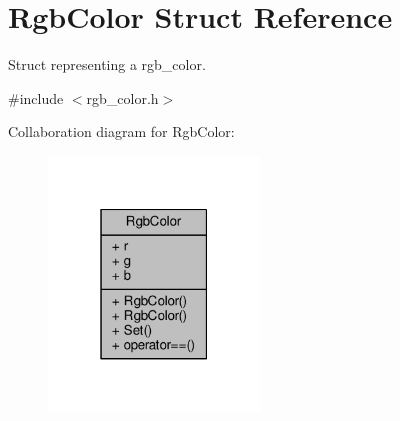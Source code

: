 \hypertarget{structRgbColor}{}\section{Rgb\+Color Struct Reference}
\label{structRgbColor}


Struct representing a rgb\+\_\+color.  




{\ttfamily \#include $<$rgb\+\_\+color.\+h$>$}



Collaboration diagram for Rgb\+Color\+:\nopagebreak
\begin{figure}[H]
\begin{center}
\leavevmode
\includegraphics[width=159pt]{structRgbColor__coll__graph}
\end{center}
\end{figure}
